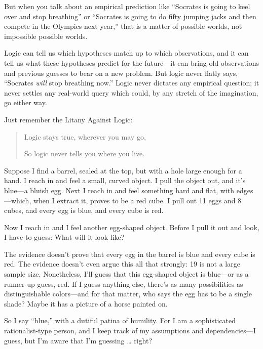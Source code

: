 {
 But when you talk about an empirical prediction like
``Socrates is going to keel over and stop
breathing'' or ``Socrates is going
to do fifty jumping jacks and then compete in the Olympics next
year,'' that is a matter of possible worlds, not
impossible possible worlds.}

{
 Logic can tell us which hypotheses match up to which observations,
and it can tell us what these hypotheses predict for the future---it
can bring old observations and previous guesses to bear on a new
problem. But logic never flatly says, ``Socrates
\textit{will} stop breathing now.'' Logic never
dictates any empirical question; it never settles any real-world query
which could, by any stretch of the imagination, go either way.}

{
 Just remember the Litany Against Logic:}

\begin{quote}
{
 Logic stays true, wherever you may go,}

{
  So logic never tells you where you live.}
\end{quote}

\myendsectiontext


{
 Suppose I find a barrel, sealed at the top, but with a hole large
enough for a hand. I reach in and feel a small, curved object. I pull
the object out, and it's blue---a bluish egg. Next I
reach in and feel something hard and flat, with edges---which, when I
extract it, proves to be a red cube. I pull out 11 eggs and 8 cubes,
and every egg is blue, and every cube is red. }

{
 Now I reach in and I feel another egg-shaped object. Before I pull
it out and look, I have to guess: What will it look like?}

{
 The evidence doesn't prove that every egg in the
barrel is blue and every cube is red. The evidence
doesn't even argue this all that strongly: 19 is not a
large sample size. Nonetheless, I'll guess that this
egg-shaped object is blue---or as a runner-up guess, red. If I guess
anything else, there's as many possibilities as
distinguishable colors---and for that matter, who says the egg has to
be a single shade? Maybe it has a picture of a horse painted on.}

{
 So I say ``blue,'' with a
dutiful patina of humility. For I am a sophisticated rationalist-type
person, and I keep track of my assumptions and dependencies---I guess,
but I'm aware that I'm guessing \ldots
right?}

